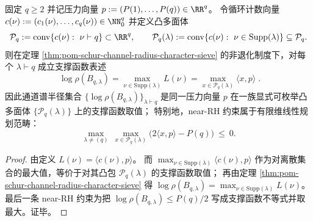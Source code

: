 \begin{corollary}\label{cor:pom-schur-pressure-polytope-shell}
固定 \(q\ge2\) 并记压力向量 \(p:=(P(1),\dots,P(q))\in\RR^q\)。
令循环计数向量
\(
c(\nu):=(c_1(\nu),\dots,c_q(\nu))\in\NN_0^q
\)
并定义凸多面体
\[
\mathcal{P}_q:=\mathrm{conv}\{c(\nu):\ \nu\vdash q\}\subset\RR^q,
\qquad
\mathcal{P}_q(\lambda):=\mathrm{conv}\{c(\nu):\ \nu\in\mathrm{Supp}(\lambda)\}\subseteq\mathcal{P}_q.
\]
则在定理 \ref{thm:pom-schur-channel-radius-character-sieve} 的非退化制度下，对每个 \(\lambda\vdash q\) 成立支撑函数表述
\[
\boxed{\;
\log\rho(B_{q,\lambda})
=
\max_{\nu\in\mathrm{Supp}(\lambda)}L(\nu)
=
\max_{x\in\mathcal{P}_q(\lambda)}\langle x,p\rangle\; }.
\]
因此通道谱半径集合
\(\{\log\rho(B_{q,\lambda})\}_{\lambda\vdash q}\)
是同一压力向量 \(p\) 在一族显式可枚举凸多面体 \(\{\mathcal{P}_q(\lambda)\}\) 上的支撑函数取值；
特别地，near-RH 约束属于有限维线性规划范畴：
\[
\max_{\lambda\neq(q)}\ \max_{x\in\mathcal{P}_q(\lambda)}\bigl(2\langle x,p\rangle-P(q)\bigr)\ \le\ 0.
\]
\end{corollary}
\begin{proof}
由定义 \(L(\nu)=\langle c(\nu),p\rangle\)。
而 \(\max_{\nu\in\mathrm{Supp}(\lambda)}\langle c(\nu),p\rangle\) 作为对离散集合的最大值，等价于对其凸包 \(\mathcal{P}_q(\lambda)\) 的支撑函数取值；
再由定理 \ref{thm:pom-schur-channel-radius-character-sieve} 得 \(\log\rho(B_{q,\lambda})=\max_{\nu\in\mathrm{Supp}(\lambda)}L(\nu)\)。
最后一条 near-RH 约束为把 \(\log\rho(B_{q,\lambda})\le P(q)/2\) 写成支撑函数不等式并取最大。证毕。
\end{proof}


